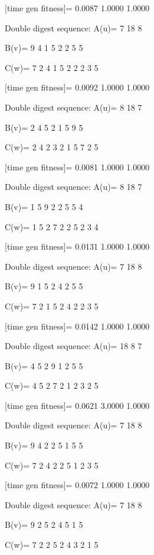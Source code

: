 [time gen fitness]=
    0.0087    1.0000    1.0000

Double digest sequence:
A(u)=
     7    18     8

B(v)=
     9     4     1     5     2     2     5     5

C(w)=
     7     2     4     1     5     2     2     2     3     5

[time gen fitness]=
    0.0092    1.0000    1.0000

Double digest sequence:
A(u)=
     8    18     7

B(v)=
     2     4     5     2     1     5     9     5

C(w)=
     2     4     2     3     2     1     5     7     2     5

[time gen fitness]=
    0.0081    1.0000    1.0000

Double digest sequence:
A(u)=
     8    18     7

B(v)=
     1     5     9     2     2     5     5     4

C(w)=
     1     5     2     7     2     2     5     2     3     4

[time gen fitness]=
    0.0131    1.0000    1.0000

Double digest sequence:
A(u)=
     7    18     8

B(v)=
     9     1     5     2     4     2     5     5

C(w)=
     7     2     1     5     2     4     2     2     3     5

[time gen fitness]=
    0.0142    1.0000    1.0000

Double digest sequence:
A(u)=
    18     8     7

B(v)=
     4     5     2     9     1     2     5     5

C(w)=
     4     5     2     7     2     1     2     3     2     5

[time gen fitness]=
    0.0621    3.0000    1.0000

Double digest sequence:
A(u)=
     7    18     8

B(v)=
     9     4     2     2     5     1     5     5

C(w)=
     7     2     4     2     2     5     1     2     3     5

[time gen fitness]=
    0.0072    1.0000    1.0000

Double digest sequence:
A(u)=
     7    18     8

B(v)=
     9     2     5     2     4     5     1     5

C(w)=
     7     2     2     5     2     4     3     2     1     5

